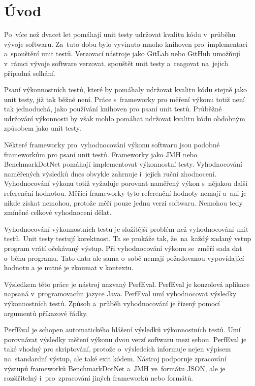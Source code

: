 \chapter{Úvod}

Po~více než dvacet let pomáhají unit testy udržovat kvalitu kódu v~průběhu vývoje
softwaru. Za~tuto dobu bylo vyvinuto mnoho knihoven pro~implementaci a~spouštění
unit testů. Verzovací nástroje jako GitLab nebo GitHub umožňují v~rámci vývoje
software verzovat, spouštět unit testy a~reagovat na~jejich případná selhání.

Psaní výkonnostních testů, které by pomáhaly udržovat kvalitu kódu stejně jako unit testy,
již tak běžné není. Práce s~frameworky pro měření výkonu totiž není tak jednoduchá,
jako používání knihoven pro psaní unit testů. Průběžné udržování výkonnosti by však mohlo
pomáhat udržovat kvalitu kódu obdobným způsobem jako unit testy.

Některé frameworky pro~vyhodnocování výkonu softwaru jsou podobné frameworkům pro psaní unit testů.
Frameworky jako JMH nebo BenchmarkDotNet pomáhají implementovat výkonnostní testy.
Vyhodnocování naměřených výsledků dnes obvykle zahrnuje i~jejich ruční zhodnocení.
Vyhodnocování výkonu totiž vyžaduje porovnat naměřený výkon s~nějakou další referenční hodnotou.
Měřící frameworky tyto referenční hodnoty nemají a~ani je nikde získat nemohou,
protože měří pouze jednu verzi softwaru. Nemohou tedy zmíněné celkové vyhodnocení dělat.

Vyhodnocování výkonnostních testů je složitější problém než vyhodnocování unit testů.
Unit testy testují korektnost. Ta se prokáže tak, že~na~každý zadaný vstup program vrátí očekávaný výstup. Při vyhodnocování
výkonu se~změří sada dat o~běhu programu. Tato data ale sama o~sobě nemají požadovanou
vypovídající hodnotu a je nutné je zkoumat v kontextu.

Výsledkem této práce je nástroj nazvaný PerfEval. PerfEval je konzolová aplikace
napsaná v~programovacím jazyce Java. PerfEval umí vyhodnocovat výsledky
výkonnostních testů. Způsob a~průběh vyhodnocování je řízený pomocí argumentů příkazové řádky.

PerfEval je schopen automatického hlášení výsledků výkonnostních testů. Umí porovnávat
výsledky měření výkonu dvou verzí softwaru mezi sebou. PerfEval je také vhodný pro
skriptování, protože o~výsledcích informuje nejen výpisem na~standardní výstup, ale
také exit kódem. Nástroj podporuje zpracování výstupů frameworků BenchmarkDotNet a~JMH ve~formátu JSON,
ale je rozšiřitelný i~pro~zpracování jiných frameworků nebo formátů.
